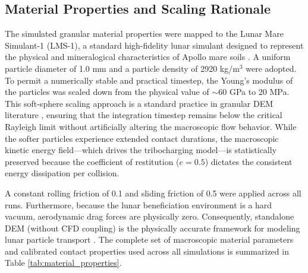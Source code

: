 \documentclass[preprint,12pt,authoryear]{elsarticle}
\begin{document}
\subsection{Material Properties and Scaling Rationale}
The simulated granular material properties were mapped to the Lunar Mare Simulant-1 (LMS-1), a standard high-fidelity lunar simulant designed to represent the physical and mineralogical characteristics of Apollo mare soils \citep{Britt2019}. A uniform particle diameter of 1.0 mm and a particle density of 2920 kg/m$^3$ were adopted. To permit a numerically stable and practical timestep, the Young's modulus of the particles was scaled down from the physical value of $\sim$60 GPa to 20 MPa. This soft-sphere scaling approach is a standard practice in granular DEM literature \citep{Roessler2018, Coetzee2017}, ensuring that the integration timestep remains below the critical Rayleigh limit without artificially altering the macroscopic flow behavior. While the softer particles experience extended contact durations, the macroscopic kinetic energy field—which drives the tribocharging model—is statistically preserved because the coefficient of restitution ($e=0.5$) dictates the consistent energy dissipation per collision. 

A constant rolling friction of 0.1 and sliding friction of 0.5 were applied across all runs. Furthermore, because the lunar beneficiation environment is a hard vacuum, aerodynamic drag forces are physically zero. Consequently, standalone DEM (without CFD coupling) is the physically accurate framework for modeling lunar particle transport \citep{Brodu2015}. The complete set of macroscopic material parameters and calibrated contact properties used across all simulations is summarized in Table \ref{tab:material_properties}.
\end{document}
